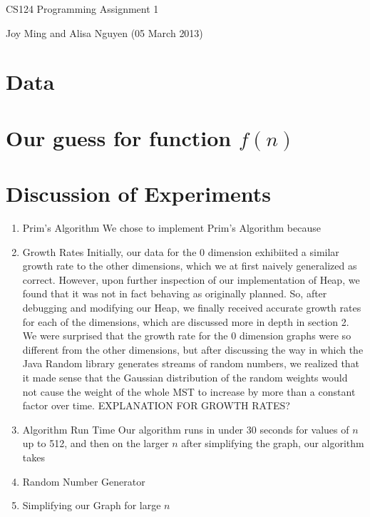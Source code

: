 \documentclass[11pt]{article}
\begin{document}
\begin{center}
\large
CS124 Programming Assignment 1
\end{center}
Joy Ming and Alisa Nguyen (05 March 2013)\\

\section{Data}
\section{Our guess for function $f(n)$}
\section{Discussion of Experiments}
\begin{enumerate}
\setcounter{enumi}{0}
\item Prim's Algorithm
\newline
\newline
We chose to implement Prim's Algorithm because 
\item Growth Rates
\newline
\newline
Initially, our data for the 0 dimension exhibiited a similar growth rate to the other dimensions, which we at first naively generalized as correct. However, upon further inspection of our implementation of Heap, we found that it was not in fact behaving as originally planned. So, after debugging and modifying our Heap, we finally received accurate growth rates for each of the dimensions, which are discussed more in depth in section 2. We were surprised that the growth rate for the 0 dimension graphs were so different from the other dimensions, but after discussing the way in which the Java Random library generates streams of random numbers, we realized that it made sense that the Gaussian distribution of the random weights would not cause the weight of the whole MST to increase by more than a constant factor over time.
\newline EXPLANATION FOR GROWTH RATES?
\item Algorithm Run Time
\newline
\newline
Our algorithm runs in under 30 seconds for values of $n$ up to 512, and then on the larger $n$ after simplifying the graph, our algorithm takes
\item Random Number Generator
\item Simplifying our Graph for large $n$
\end{enumerate}
\end{document}
